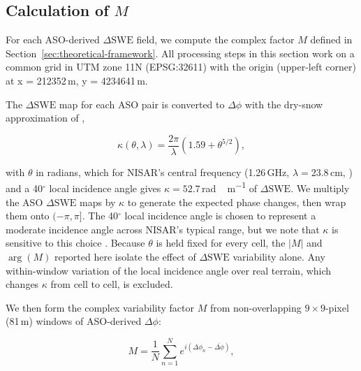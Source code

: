 \documentclass[tc, manuscript]{copernicus}
\begin{document}
\subsection{Calculation of $M$}\label{subsec:calc-M}

For each ASO-derived $\Delta\mathrm{SWE}$ field, we compute the complex factor $M$ defined in Section~\ref{sec:theoretical-framework}. All processing steps in this section work on a common grid in UTM zone 11N (EPSG:32611) with the origin (upper-left corner) at x = 212352\,\unit{m}, y = 4234641\,\unit{m}.

The $\Delta\mathrm{SWE}$ map for each ASO pair is converted to $\Delta\phi$ with the dry-snow approximation of \citet{Leinss2015},

\begin{equation}\label{eq:kappa}
    \kappa(\theta,\lambda) = \frac{2\pi}{\lambda}\left(1.59 + \theta^{5/2}\right),
\end{equation}

\noindent with $\theta$ in radians, which for NISAR's central frequency (1.26\,\unit{GHz}, $\lambda = 23.8$\,\unit{cm}, \citealp{nisar2025handbook}) and a 40$^{\circ}$ local incidence angle gives $\kappa = 52.7$\,\unit{rad\,m^{-1}} of $\Delta\mathrm{SWE}$. We multiply the ASO $\Delta\mathrm{SWE}$ maps by $\kappa$ to generate the expected phase changes, then wrap them onto $(-\pi, \pi]$. The 40$^{\circ}$ local incidence angle is chosen to represent a moderate incidence angle across NISAR's typical range, but we note that $\kappa$ is sensitive to this choice \citep{Leinss2015}. Because $\theta$ is held fixed for every cell, the $|M|$ and $\arg(M)$ reported here isolate the effect of $\Delta\mathrm{SWE}$ variability alone. Any within-window variation of the local incidence angle over real terrain, which changes $\kappa$ from cell to cell, is excluded.

We then form the complex variability factor $M$ from non-overlapping $9\times9$-pixel (81\,\unit{m}) windows of ASO-derived $\Delta\phi$:

\begin{equation}\label{eq:calc_m}
    M = \frac{1}{N}\sum_{n=1}^{N} e^{i(\Delta\phi_n - \overline{\Delta\phi})},
\end{equation}
\end{document}
